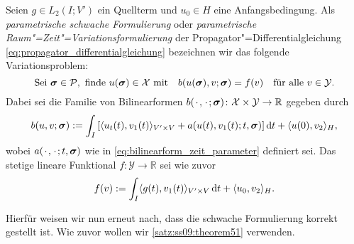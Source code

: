 \documentclass[../main.tex]{subfiles}
\begin{document}
\begin{Definition}%
\label{definition:parametrische_rz_variationsformulierung}
    Seien $g \in L_{2}(I; V')$ ein Quellterm und $u_{0} \in H$ eine Anfangsbedingung.
    Als \emph{parametrische schwache Formulierung} oder \emph{parametrische Raum"=Zeit"=Variationsformulierung} der Propagator"=Differentialgleichung \cref{eq:propagator_differentialgleichung} bezeichnen wir das folgende Variationsproblem:
    \begin{equation}
    \label{eq:parametrisches_rz_variationsproblem}
        \text{Sei}~\bm\sigma \in \mathcal P,~\text{finde}~u(\bm\sigma) \in \mathcal X \text{ mit} \quad b(u(\bm\sigma), v; \bm\sigma) = f(v) \quad \fa v \in \mathcal Y.
    \end{equation}
    Dabei sei die Familie von Bilinearformen $b({\mkern2mu\cdot\mkern2mu}, {\mkern2mu\cdot\mkern2mu}; \bm\sigma) \colon \mathcal X \times \mathcal Y \to \mathbb{R}$ gegeben durch
     \begin{equation}
     \label{eq:parametrisches_rz_variationsproblem:lhs}
         b(u, v; \bm\sigma)
             := \int_{I} \left[ \skp{u_{t}(t)}{v_{1}(t)}{V' \times V} + a(u(t), v_{1}(t); t, \bm\sigma) \right] \diff t + \skp{u(0)}{v_{2}}{H},
     \end{equation}
     wobei $a({\mkern2mu\cdot\mkern2mu}, {\mkern2mu\cdot\mkern2mu}; t, \bm\sigma)$ wie in \cref{eq:bilinearform_zeit_parameter} definiert sei.
     Das stetige lineare Funktional $f \colon \mathcal Y \to \mathbb{R}$ sei wie zuvor
     \begin{equation}
     \label{eq:parametrisches_rz_variationsproblem:rhs}
         f(v) := \int_{I} \skp{g(t)}{v_{1}(t)}{V' \times V} \diff t + \skp{u_{0}}{v_{2}}{H}.
     \end{equation}
\end{Definition}

Hierfür weisen wir nun erneut nach, dass die schwache Formulierung korrekt gestellt ist.
Wie zuvor wollen wir \cref{satz:ss09:theorem51} verwenden.
\end{document}
